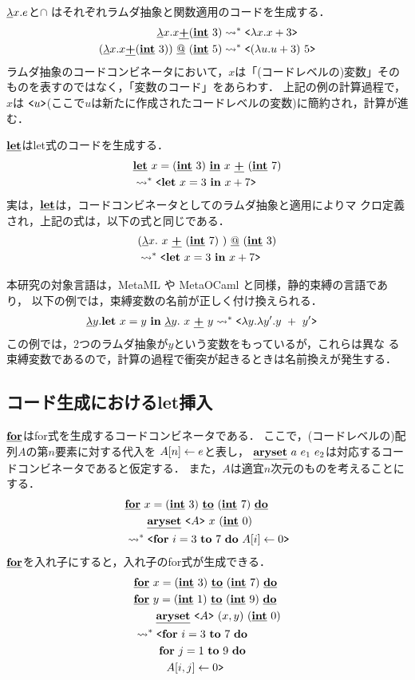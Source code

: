 $\cfun{x}{e}$と$\cap$ はそれぞれラムダ抽象と関数適用のコードを生成する．
\begin{align*}
\cfun{x}{x \cPlus (\cint~3)}   & \too \code{\fun{x}{x+3}} \\
(\cfun{x}{x \cPlus (\cint~3)}) \cat (\cint~5) & \too
\code{(\fun{u}{u+3})~5}
\end{align*}
ラムダ抽象のコードコンビネータにおいて，$x$は「(コードレベルの)変数」その
ものを表すのではなく，「変数のコード」をあらわす．
上記の例の計算過程で，$x$は
$\code{u}$(ここで$u$は新たに作成されたコードレベルの変数)に簡約され，計算が進む．

$\cLet$はlet式のコードを生成する．
\begin{align*}
& \clet{x}{(\cint~3)}{x~ \cPlus~ (\cint~7)} \\
  & \too \code{\Let~ x = 3~ \In~ x + 7}
\end{align*}
実は，$\cLet$は，コードコンビネータとしてのラムダ抽象と適用によりマ
クロ定義され，上記の式は，以下の式と同じである．
\begin{align*}
& (\cfun{x}{~x~ \cPlus~ (\cint~7)~}) \cat (\cint~3)  \\
& \too \code{\Let~ x = 3~ \In~ x + 7}
\end{align*}

本研究の対象言語は，MetaML や MetaOCaml と同様，静的束縛の言語であり，
以下の例では，束縛変数の名前が正しく付け換えられる．
\begin{align*}
\cfun{y}{\Let~ x = y~ \In~ \cfun{y}{~x~ \cPlus~ y}{}}{}
& \too \code{\fun{y}{\fun{y'}{y~ +~ y'}}}
\end{align*}
この例では，2つのラムダ抽象が$y$という変数をもっているが，これらは異な
る束縛変数であるので，計算の過程で衝突が起きるときは名前換えが発生する．

\subsection{コード生成におけるlet挿入}

$\cFor$はfor式を生成するコードコンビネータである．
ここで，(コードレベルの)配列$A$の第$n$要素に対する代入を
$\aryset{A}{n}{e}$と表し，
$\caryset{a}{e_1}{e_2}$は対応するコードコンビネータであると仮定する．
また，$A$は適宜$n$次元のものを考えることにする．
\begin{align*}
& \cforin{x=(\cint~3)}{(\cint~7)} \\
& \qquad \caryset{\code{A}}{x}{(\cint~0)} \\
& \too \code{\forin{i=3}{7}~\aryset{A}{i}{0}}
\end{align*}
$\cFor$を入れ子にすると，入れ子のfor式が生成できる．
\begin{align*}
& \cforin{x=(\cint~3)}{(\cint~7)} \\
& \cforin{y=(\cint~1)}{(\cint~9)} \\
& \qquad \caryset{\code{A}}{(x,y)}{(\cint~0)} \\
& \too \codebegin \forin{i=3}{7} \\
& \phantom{\too \codebegin} \forin{j=1}{9} \\
& \phantom{\too \codebegin} ~~\aryset{A}{i,j}{0} \codeend
\end{align*}

